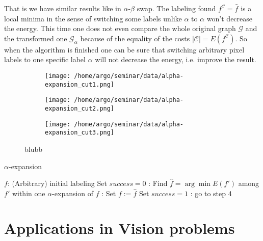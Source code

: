 \documentclass{scrartcl}[12pt, halfparskip]
\begin{document}
That is we have similar results like in $\alpha$-$\beta$ swap. The labeling found $f^\mathcal{C}=\hat{f}$ is a local minima in the sense of switching some labels unlike $\alpha$ to $\alpha$ won't decrease the energy. This time one does not even compare the whole original graph $\mathcal{G}$ and the transformed one $\mathcal{G}_\alpha$ because of the equality of the costs $|\mathcal{C}| = E(f^\mathcal{C})$. So when the algorithm is finished one can be sure that switching arbitrary pixel labels to one specific label $\alpha$ will not decrease the energy, i.e. improve the result.


\begin{figure}[H]
	\begin{subfigure}{0.32\textwidth}
		\centering
		\texttt{[image: /home/argo/seminar/data/alpha-expansion\_cut1.png]}
		\caption{}
		\label{fig:alpha-expansion_Gab_cut1}
	\end{subfigure}
	\begin{subfigure}{0.32\textwidth}
		\centering
		\texttt{[image: /home/argo/seminar/data/alpha-expansion\_cut2.png]}
		\caption{}
		\label{fig:alpha-expansion_Gab_cut2}
	\end{subfigure}
	\begin{subfigure}{0.32\textwidth}
		\centering
		\texttt{[image: /home/argo/seminar/data/alpha-expansion\_cut3.png]}
		\caption{}
		\label{fig:alpha-expansion_Gab_cut3}
	\end{subfigure}
\caption{blubb}
\label{fig:alpha-expansion_Gab_cuts}
\end{figure}



\begin{algorithm}[H]
\caption{$\alpha$-expansion}\label{alg:alpha-expansion}
\begin{algorithmic}[1]
	\State $f$: (Arbitrary) initial labeling 
	\State
	\State Set $success = 0$
	:
		\State Find $\hat{f} = \arg \min E(f')$ among $f'$ within one $\alpha$-expansion of $f$
		:
			\State Set $f := \hat{f}$
			\State Set $success = 1$
		\EndIf
	\EndFor
	:
		\State go to step 4
	\EndIf
	\State
	\State {}
\EndProcedure
\end{algorithmic}
\end{algorithm}


\section{Applications in Vision problems}
\end{document}
